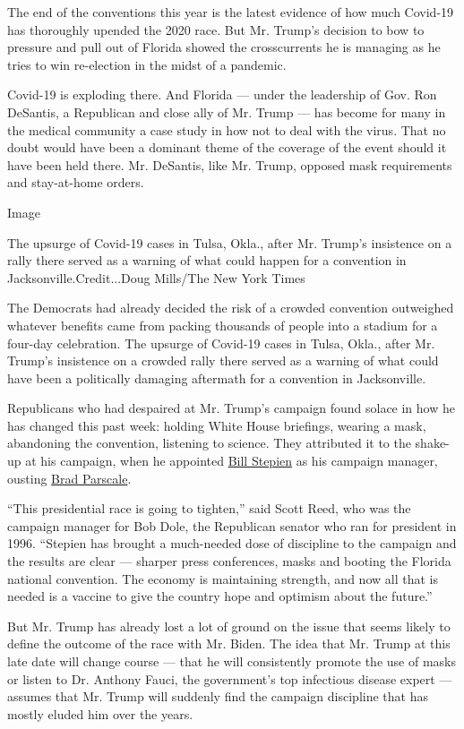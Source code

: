 The end of the conventions this year is the latest evidence of how much
Covid-19 has thoroughly upended the 2020 race. But Mr. Trump's decision
to bow to pressure and pull out of Florida showed the crosscurrents he
is managing as he tries to win re-election in the midst of a pandemic.

Covid-19 is exploding there. And Florida --- under the leadership of
Gov. Ron DeSantis, a Republican and close ally of Mr. Trump --- has
become for many in the medical community a case study in how not to deal
with the virus. That no doubt would have been a dominant theme of the
coverage of the event should it have been held there. Mr. DeSantis, like
Mr. Trump, opposed mask requirements and stay-at-home orders.

Image

The upsurge of Covid-19 cases in Tulsa, Okla., after Mr. Trump's
insistence on a rally there served as a warning of what could happen for
a convention in Jacksonville.Credit...Doug Mills/The New York Times

The Democrats had already decided the risk of a crowded convention
outweighed whatever benefits came from packing thousands of people into
a stadium for a four-day celebration. The upsurge of Covid-19 cases in
Tulsa, Okla., after Mr. Trump's insistence on a crowded rally there
served as a warning of what could have been a politically damaging
aftermath for a convention in Jacksonville.

Republicans who had despaired at Mr. Trump's campaign found solace in
how he has changed this past week: holding White House briefings,
wearing a mask, abandoning the convention, listening to science. They
attributed it to the shake-up at his campaign, when he appointed
\href{https://www.nytimes3xbfgragh.onion/article/bill-stepien.html}{Bill
Stepien} as his campaign manager, ousting
\href{https://www.nytimes3xbfgragh.onion/2020/07/15/us/politics/trump-campaign-brad-parscale.html}{Brad
Parscale}.

``This presidential race is going to tighten,'' said Scott Reed, who was
the campaign manager for Bob Dole, the Republican senator who ran for
president in 1996. ``Stepien has brought a much-needed dose of
discipline to the campaign and the results are clear --- sharper press
conferences, masks and booting the Florida national convention. The
economy is maintaining strength, and now all that is needed is a vaccine
to give the country hope and optimism about the future.''

But Mr. Trump has already lost a lot of ground on the issue that seems
likely to define the outcome of the race with Mr. Biden. The idea that
Mr. Trump at this late date will change course --- that he will
consistently promote the use of masks or listen to Dr. Anthony Fauci,
the government's top infectious disease expert --- assumes that Mr.
Trump will suddenly find the campaign discipline that has mostly eluded
him over the years.

